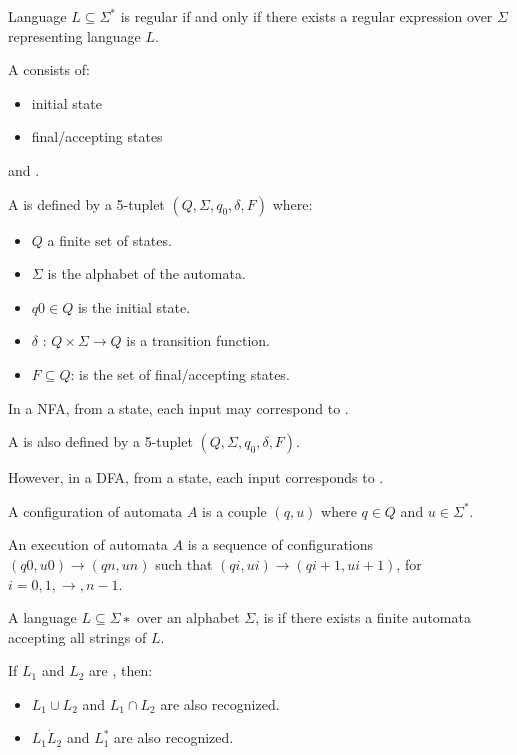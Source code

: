     \par Language $L \subseteq \Sigma^*$ is regular if and only if there exists a regular expression over $\Sigma$ representing language $L$.

  \par A  consists of:
  \begin{itemize}
    \item {} initial state
    \item {} final/accepting states
  \end{itemize}
  and .

  \par A  is defined by a 5-tuplet $(Q, \Sigma, q_0, \delta, F)$ where:
  \begin{itemize}
    \item $Q$ a finite set of states.
    \item $\Sigma$ is the alphabet of the automata.
    \item $q0 \in Q$ is the initial state.
    \item $\delta$ : $Q × \Sigma \to Q$ is a transition function.
    \item $F \subseteq Q$: is the set of final/accepting states.
  \end{itemize}
  \par In a NFA, from a state, each input may correspond to . 

    \par A  is also defined by a 5-tuplet $(Q, \Sigma, q_0, \delta, F)$.
    \par However, in a DFA, from a state, each input corresponds to .

  \par A configuration of automata $A$ is a couple $(q, u)$ where $q \in Q$ and $u \in \Sigma^*$.
  \par An execution of automata $A$ is a sequence of configurations $(q0, u0) \to (qn, un)$ such that $(qi, ui) \to (qi+1, ui+1)$, for $i = 0, 1, \to, n − 1$.

  \par A language $L \subseteq \Sigma∗$ over an alphabet $\Sigma$, is  if there exists a finite automata accepting all strings of $L$.
  \par If $L_1$ and $L_2$ are , then:
  \begin{itemize}
    \item $L_1 \cup L_2$ and $L_1 \cap L_2$ are also recognized.
    \item $L_1 \dot L_2$ and $L_1^*$ are also recognized.    
  \end{itemize}

